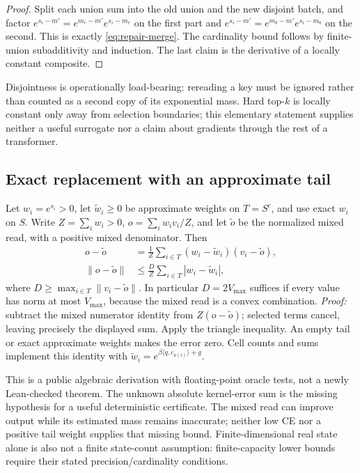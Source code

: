 \documentclass[11pt]{article}
\numberwithin{equation}{section}
\newcommand{\inner}[2]{\langle #1, #2\rangle}
\begin{document}
\begin{proof}
Split each union sum into the old union and the new disjoint batch, and factor
$e^{s_i-m'}=e^{m_r-m'}e^{s_i-m_r}$ on the first part and
$e^{s_i-m'}=e^{m_b-m'}e^{s_i-m_b}$ on the second. This is exactly
\eqref{eq:repair-merge}. The cardinality bound follows by finite-union subadditivity and induction. The last
claim is the derivative of a locally constant composite.
\end{proof}

Disjointness is operationally load-bearing: rereading a key must be ignored rather than counted as a second
copy of its exponential mass. Hard top-$k$ is locally constant only away from selection boundaries; this
elementary statement supplies neither a useful surrogate nor a claim about gradients through the rest of a
transformer.

\subsection{Exact replacement with an approximate tail}

Let $w_i=e^{s_i}>0$, let $\widetilde w_i\ge0$ be approximate weights on $T=S^c$, and use exact $w_i$ on
$S$. Write $Z=\sum_i w_i>0$, $o=\sum_i w_iv_i/Z$, and let $\widetilde o$ be the normalized mixed read,
with a positive mixed denominator. Then
\begin{equation}\label{eq:tail-kernel-error}
\begin{split}
o-\widetilde o&=\frac1Z\sum_{i\in T}(w_i-\widetilde w_i)(v_i-\widetilde o),\\
\|o-\widetilde o\|&\le\frac{D}{Z}\sum_{i\in T}|w_i-\widetilde w_i|,
\end{split}
\end{equation}
where $D\ge\max_{i\in T}\|v_i-\widetilde o\|$. In particular $D=2V_{\max}$ suffices if every value has
norm at most $V_{\max}$, because the mixed read is a convex combination. \emph{Proof:} subtract the mixed
numerator identity from $Z(o-\widetilde o)$; selected terms cancel, leaving precisely the displayed sum.
Apply the triangle inequality. An empty tail or exact approximate weights makes the error zero. Cell
counts and sums implement this identity with $\widetilde w_i=e^{\beta\inner{q}{c_{a(i)}}+g}$.

This is a public algebraic derivation with floating-point oracle tests, not a newly Lean-checked theorem.
The unknown absolute kernel-error sum is the missing hypothesis for a useful deterministic certificate.
The mixed read can improve output while its estimated mass remains inaccurate; neither low CE nor a
positive tail weight supplies that missing bound. Finite-dimensional real state alone is also not a finite
state-count assumption: finite-capacity lower bounds require their stated precision/cardinality conditions.
\end{document}
